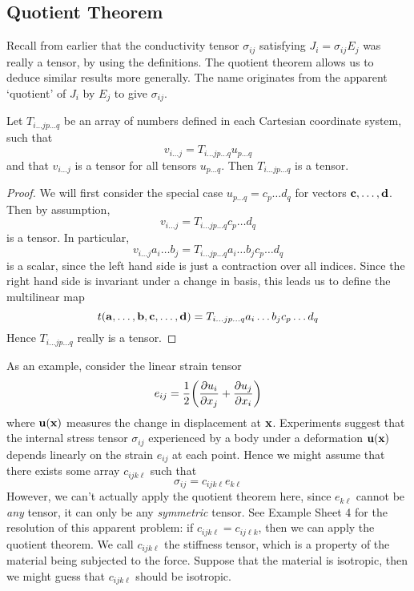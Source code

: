 \subsection{Quotient Theorem}
Recall from earlier that the conductivity tensor \(\sigma_{ij}\) satisfying \(J_i = \sigma_{ij} E_j\) was really a tensor, by using the definitions.
The quotient theorem allows us to deduce similar results more generally.
The name originates from the apparent `quotient' of \(J_i\) by \(E_j\) to give \(\sigma_{ij}\).
\begin{proposition}
	Let \(T_{i\dots j p\dots q}\) be an array of numbers defined in each Cartesian coordinate system, such that
	\[
		v_{i\dots j} = T_{i\dots j p \dots q} u_{p\dots q}
	\]
	and that \(v_{i\dots j}\) is a tensor for all tensors \(u_{p\dots q}\).
	Then \(T_{i\dots j p\dots q}\) is a tensor.
\end{proposition}
\begin{proof}
	We will first consider the special case \(u_{p\dots q} = c_p \dots d_q\) for vectors \(\vb c, \dots, \vb d\).
	Then by assumption,
	\[
		v_{i\dots j} = T_{i\dots j p \dots q} c_p \dots d_q
	\]
	is a tensor.
	In particular,
	\[
		v_{i\dots j} a_i \dots b_j = T_{i\dots j p \dots q} a_i \dots b_j c_p \dots d_q
	\]
	is a scalar, since the left hand side is just a contraction over all indices.
	Since the right hand side is invariant under a change in basis, this leads us to define the multilinear map
	\[
		t(\vb a, \dots, \vb b, \vb c, \dots, \vb d) = T_{i\dots j p \dots q} a_i \dots b_j c_p \dots d_q
	\]
	Hence \(T_{i\dots j p \dots q}\) really is a tensor.
\end{proof}
\noindent As an example, consider the linear strain tensor
\[
	e_{ij} = \frac{1}{2}\qty( \pdv{u_i}{x_j} + \pdv{u_j}{x_i} )
\]
where \(\vb u(\vb x)\) measures the change in displacement at \(\vb x\).
Experiments suggest that the internal stress tensor \(\sigma_{ij}\) experienced by a body under a deformation \(\vb u(\vb x)\) depends linearly on the strain \(e_{ij}\) at each point.
Hence we might assume that there exists some array \(c_{ijk\ell}\) such that
\[
	\sigma_{ij} = c_{ijk\ell} e_{k\ell}
\]
However, we can't actually apply the quotient theorem here, since \(e_{k\ell}\) cannot be \textit{any} tensor, it can only be any \textit{symmetric} tensor.
See Example Sheet 4 for the resolution of this apparent problem: if \(c_{ijk\ell} = c_{ij\ell k}\), then we can apply the quotient theorem.
We call \(c_{ijk\ell}\) the stiffness tensor, which is a property of the material being subjected to the force.
Suppose that the material is isotropic, then we might guess that \(c_{ijk\ell}\) should be isotropic.
